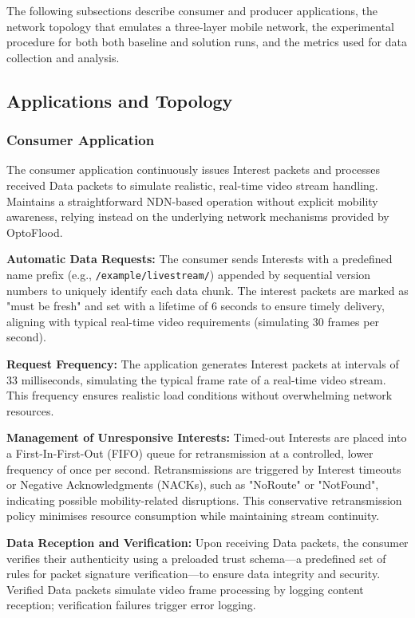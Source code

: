 \documentclass[conference]{IEEEtran}
\begin{document}
The following subsections describe consumer and producer applications, the network topology that emulates a three-layer mobile network, the experimental procedure for both both baseline and solution runs, and the metrics used for data collection and analysis.

\subsection{Applications and Topology}

\subsubsection{Consumer Application}

The consumer application continuously issues Interest packets and processes received Data packets to simulate realistic, real-time video stream handling. Maintains a straightforward NDN-based operation without explicit mobility awareness, relying instead on the underlying network mechanisms provided by OptoFlood.

\textbf{Automatic Data Requests:}
The consumer sends Interests with a predefined name prefix (e.g., \texttt{/example/livestream/}) appended by sequential version numbers to uniquely identify each data chunk. The interest packets are marked as "must be fresh" and set with a lifetime of 6 seconds to ensure timely delivery, aligning with typical real-time video requirements (simulating 30 frames per second).

\textbf{Request Frequency:}
The application generates Interest packets at intervals of 33 milliseconds, simulating the typical frame rate of a real-time video stream. This frequency ensures realistic load conditions without overwhelming network resources.

\textbf{Management of Unresponsive Interests:}
Timed-out Interests are placed into a First-In-First-Out (FIFO) queue for retransmission at a controlled, lower frequency of once per second. Retransmissions are triggered by Interest timeouts or Negative Acknowledgments (NACKs), such as "NoRoute" or "NotFound", indicating possible mobility-related disruptions. This conservative retransmission policy minimises resource consumption while maintaining stream continuity.

\textbf{Data Reception and Verification:}
Upon receiving Data packets, the consumer verifies their authenticity using a preloaded trust schema—a predefined set of rules for packet signature verification—to ensure data integrity and security. Verified Data packets simulate video frame processing by logging content reception; verification failures trigger error logging.
\end{document}
